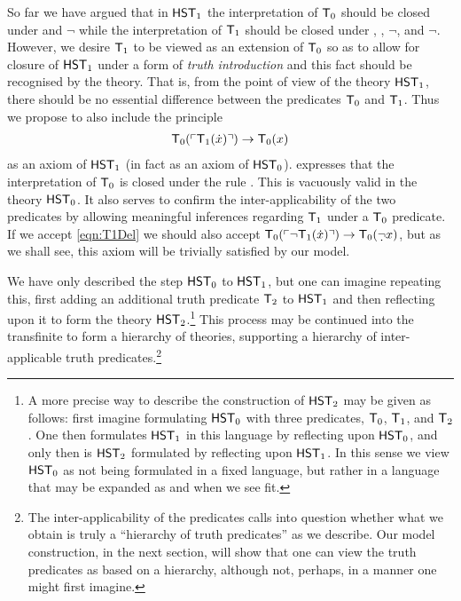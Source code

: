 \documentclass[UKenglish,cleveref,DIV=12]{scrartcl}
\theoremstyle{definition}
\theoremstyle{definition}
\begin{document}
So far we have argued that in $\mathsf{HST}_1$ the interpretation of $\mathsf{T}_0$ should be
closed under  and $\lnot$ while the interpretation of
$\mathsf{T}_1$ should be closed under , , $\lnot$,
 and $\lnot$. However, we desire $\mathsf{T}_1$ to be
viewed as an extension of $\mathsf{T}_0$ so as to allow for closure of $\mathsf{HST}_1$ under a
form of {\em truth introduction} and this fact should be recognised by the
theory. That is, from the point of view of the theory $\mathsf{HST}_1$, there should be no
essential difference between the predicates $\mathsf{T}_0$ and $\mathsf{T}_1$. Thus we propose to
also include the principle
\begin{gather}\label{eqn:T1Del}
  \mathsf{T}_0(\ulcorner{\mathsf{T}_1(\dot x)}\urcorner)\rightarrow \mathsf{T}_0(x)
\end{gather}
as an axiom of $\mathsf{HST}_1$ (in fact as an axiom of $\mathsf{HST}_0$).
 expresses that the interpretation of $\mathsf{T}_0$ is closed under
the rule . This is vacuously valid in the theory $\mathsf{HST}_0$. It also
serves to confirm the inter-applicability of the two predicates by allowing
meaningful inferences regarding $\mathsf{T}_1$ under a $\mathsf{T}_0$ predicate. If we accept
\cref{eqn:T1Del} we should also accept $\T_0(\gn{\lnot \T_1(\dot x)})\rightarrow
\T_0(\dlnot x)$, but as we shall see, this axiom will be trivially satisfied by
our model.


We have only described the step $\mathsf{HST}_0$ to $\mathsf{HST}_1$, but one can imagine repeating
this, first adding an additional truth predicate $\mathsf{T}_2$ to $\mathsf{HST}_1$ and then
reflecting upon it to form the theory $\mathsf{HST}_2$.\footnote{A more precise
way to describe the construction of $\mathsf{HST}_2$ may be given as follows: first imagine formulating $\mathsf{HST}_0$
with three predicates, $\mathsf{T}_0$, $\mathsf{T}_1$, and $\mathsf{T}_2$. One then formulates $\mathsf{HST}_1$ in this
language by reflecting upon $\mathsf{HST}_0$, and only then is $\mathsf{HST}_2$ formulated by reflecting
upon $\mathsf{HST}_1$. In this sense we view $\mathsf{HST}_0$ as not being formulated in a fixed
language, but rather in a language that may be expanded as and when we see fit.} This process may be
continued into the transfinite to form a hierarchy of theories, supporting a
hierarchy of inter-applicable truth predicates.\footnote{The inter-applicability
of the predicates calls into question whether what we obtain is truly a
``hierarchy of truth predicates'' as we describe. Our model construction, in the
next section, will show that one {can} view the truth predicates as based on
a hierarchy, although not, perhaps, in a manner one might first imagine.}
\end{document}
